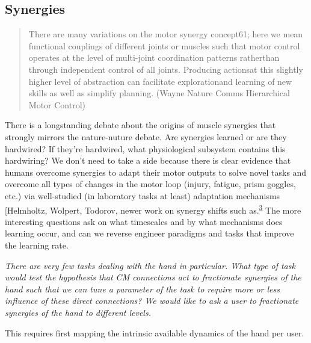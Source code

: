 {            \hypertarget{synergies}{%
            \subsection{Synergies}\label{synergies}}

            \begin{quote}
            There are many variations on the motor synergy concept61;
            here we mean functional couplings of different joints or
            muscles such that motor control operates at the level of
            multi-joint coordination patterns ratherthan through
            independent control of all joints. Producing actionsat this
            slightly higher level of abstraction can facilitate
            explorationand learning of new skills as well as simplify
            planning. (Wayne Nature Comms Hierarchical Motor Control)
            \end{quote}

            There is a longstanding debate about the origins of muscle
            synergies that strongly mirrors the nature-nuture debate.
            Are synergies learned or are they hardwired? If they're
            hardwired, what physiological subsystem contains this
            hardwiring? We don't need to take a side because there is
            clear evidence that humans overcome synergies to adapt their
            motor outputs to solve novel tasks and overcome all types of
            changes in the motor loop (injury, fatigue, prism goggles,
            etc.) via well-studied (in laboratory tasks at least)
            adaptation mechanisms {[}Helmholtz, Wolpert, Todorov, newer
            work on synergy shifts such
            as.\textsuperscript{\protect\hyperlink{ref-DeRugy2012}{3}}
            The more interesting questions ask on what timescales and by
            what mechanisms does learning occur, and can we reverse
            engineer paradigms and tasks that improve the learning rate.

            \emph{There are very few tasks dealing with the hand in
            particular. What type of task would test the hypothesis that
            CM connections act to fractionate synergies of the hand such
            that we can tune a parameter of the task to require more or
            less influence of these direct connections? We would like to
            ask a user to fractionate synergies of the hand to different
            levels.}

            This requires first mapping the intrinsic available dynamics
            of the hand per user.

}

